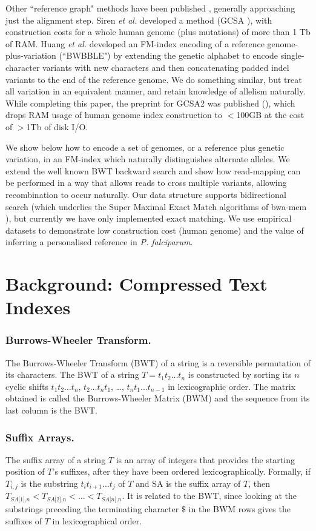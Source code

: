 \documentclass[runningheads,a4paper]{llncs}
\begin{document}
Other ``reference graph" methods have been published \cite{korbinian,siren1,huang}, generally approaching just the alignment step.  Siren \textit{et al.} developed a method (GCSA \cite{siren1}), with construction costs for a whole human genome (plus mutations) of more than 1 Tb of RAM. Huang \textit{et al.} \cite{huang} developed an FM-index \cite{fmindex} encoding of a reference genome-plus-variation (``BWBBLE") by extending the genetic alphabet to encode single-character variants with new characters and then concatenating padded indel variants to the end of the reference genome. We do something similar, but treat all variation in an equivalent manner, and retain knowledge of allelism naturally.  While completing this paper, the preprint for GCSA2 was published (\cite{siren2}), which drops RAM usage of human genome index construction to $<$100GB at the cost of $>$1Tb of disk I/O.   

 We show below how to encode a set of genomes, or a reference plus  genetic variation, in an FM-index which naturally distinguishes alternate alleles. We extend the well known BWT backward search and show how read-mapping can be performed in a way that allows reads to cross multiple variants, allowing recombination to occur naturally. Our data structure  supports bidirectional search (which underlies the Super Maximal Exact Match algorithms of bwa-mem \cite{bwa}), but currently we have only implemented exact matching. We use empirical datasets to demonstrate low construction cost (human genome) and the value of inferring a personalised reference in \textit{P. falciparum}.  


\section{Background: Compressed Text Indexes}

\subsubsection{Burrows-Wheeler Transform.}
The Burrows-Wheeler Transform (BWT) of a string is a reversible permutation of its characters. The BWT of a string $T=t_1t_2 \ldots t_n$ is constructed by sorting its $n$ cyclic shifts $t_1t_2 \ldots t_n$, $t_2 \ldots t_n t_1$, \ldots,  $t_n t_1 \ldots t_{n-1}$ in lexicographic order. The matrix obtained is called the Burrows-Wheeler Matrix (BWM) and the sequence from its last column is the BWT.  
\subsubsection{Suffix Arrays.} The suffix array of a string $T$ is an array of integers that provides the starting position of $T$'s suffixes, after they have been ordered lexicographically. Formally, if $T_{i,j}$ is the substring $t_i t_{i+1} \ldots t_j$ of $T$ and SA is the suffix array of $T$, then $T_{\textit{SA[1],n}}<T_{\textit{SA[2],n}}<\ldots <T_{\textit{SA[n],n}}$. It is related to the BWT, since looking at the substrings preceding the terminating character $\$$ in the BWM rows gives the suffixes of $T$ in lexicographical order. 
\end{document}
